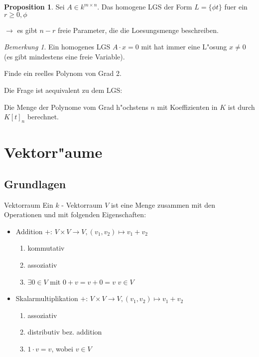 \documentclass[oneside,fontsize=11pt,paper=a4,BCOR=0mm,DIV=12,automark,headsepline]{scrbook}
\theoremstyle{remark}
\theoremstyle{definition}
\newtheorem*{proposition}{Proposition}
\theoremstyle{definition}
\theoremstyle{remark}
\newtheorem*{bem}{Bemerkung}
\begin{document}
\begin{proposition}
  Sei \(A\in k^{m\times n}\). Das homogene LGS der Form \(L=\{\phi
  t \}\) fuer ein \(r\geq 0, \phi\)

  \(\rightarrow\) es gibt \(n-r\) freie Parameter, die die Loesungsmenge beschreiben.
\end{proposition}

\begin{bem}
  Ein homogenes LGS \(A\cdot x=0\) mit  hat immer eine L"osung \(x\not=
  0\) (es gibt mindestens eine freie Variable).
\end{bem}

\begin{exa}
  Finde ein reelles Polynom von Grad 2.

  Die Frage ist aequivalent zu dem LGS:
\end{exa}

\begin{definition}{}{}
  Die Menge der Polynome vom Grad h"ochstens \(n\) mit Koeffizienten in \(K\) ist
  durch \(K[t]_n\) berechnet.
\end{definition}


\part{Vektorr"aume}
\chapter{Grundlagen}
\label{sec:org4906e00}
\begin{definition}{Vektorraum}{}
  Ein \(k\) - Vektorraum \(V\) ist eine Menge zusammen mit den Operationen und mit
  folgenden Eigenschaften:
  \begin{itemize}
  \item Addition \(+:\, V\times V \to V, (v_1,v_2)\mapsto v_1+v_2\)
    \begin{enumerate}
    \item kommutativ
    \item assoziativ
    \item \(\exists 0 \in V\) mit \(0+v=v+0=v\) \(v \in V\)
    \end{enumerate}
  \item Skalarmultiplikation \(+:\, V\times V \to V, (v_1,v_2)\mapsto v_1+v_2\)
    \begin{enumerate}
    \item assoziativ
    \item distributiv bez. addition
    \item \(1\cdot v = v\), wobei \(v\in V\)
    \end{enumerate}
  \end{itemize}
\end{definition}
\end{document}
